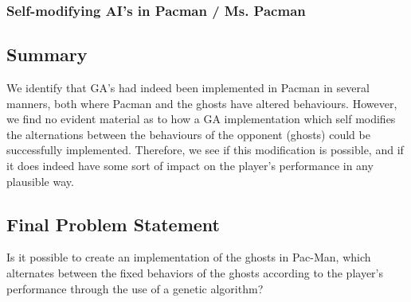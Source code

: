 \subsubsection{Self-modifying AI's in Pacman / Ms. Pacman}

\subsection{Summary}
We identify that GA’s had indeed been implemented in Pacman in several manners, both where Pacman and the ghosts have altered behaviours. However, we find no evident material as to how a GA implementation which self modifies the alternations between the behaviours of the opponent (ghosts) could be successfully implemented. Therefore, we see if this modification is possible, and if it does indeed have some sort of impact on the player’s performance in any plausible way.


\subsection{Final Problem Statement} \label{sec:finalproblemstatement}
Is it possible to create an implementation of the ghosts in Pac-Man, which alternates between the fixed behaviors of the ghosts according to the player's performance through the use of a genetic algorithm?